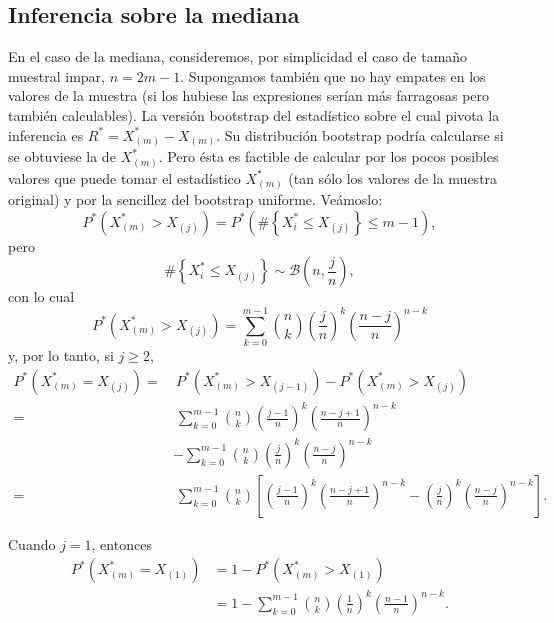 \documentclass[
]{book}
\theoremstyle{definition}
\theoremstyle{definition}
\theoremstyle{definition}
\theoremstyle{remark}
\begin{document}
\hypertarget{inferencia-sobre-la-mediana}{%
\subsection{Inferencia sobre la mediana}\label{inferencia-sobre-la-mediana}}

En el caso de la mediana, consideremos, por simplicidad el caso de
tamaño muestral impar, \(n=2m-1\). Supongamos también que no hay empates
en los valores de la muestra (si los hubiese las expresiones serían más
farragosas pero también calculables). La versión bootstrap del
estadístico sobre el cual pivota la inferencia es \(R^{\ast}=X_{\left( m \right)}^{\ast}-X_{(m)}\). Su distribución bootstrap
podría calcularse si se obtuviese la de \(X_{(m)}^{\ast}\).
Pero ésta es factible de calcular por los pocos posibles valores que
puede tomar el estadístico \(X_{(m)}^{\ast}\) (tan sólo los
valores de la muestra original) y por la sencillez del bootstrap
uniforme.
Veámoslo:
\[P^{\ast}\left( X_{(m)}^{\ast}>X_{(j)} \right)
=P^{\ast}\left( \#\left\{ X_i^{\ast}\leq X_{(j)}\right\}
\leq m-1 \right),\]
pero
\[\#\left\{ X_i^{\ast}\leq X_{(j)}\right\} \sim \mathcal{B}\left(
n,\frac{j}{n} \right),\]
con lo cual
\[P^{\ast}\left( X_{(m)}^{\ast}>X_{(j)} \right)
=\sum_{k=0}^{m-1}\binom{n}{k}\left( \frac{j}{n} \right)^{k}
\left( \frac{n-j}{n} \right)^{n-k}\]
y, por lo tanto, si \(j\geq 2\),
\[\begin{aligned}
P^{\ast}\left( X_{(m)}^{\ast}=X_{(j)} \right)
=&\ P^{\ast}\left( X_{(m)}^{\ast}>X_{\left( j-1 \right)} \right)
-P^{\ast}\left( X_{(m)}^{\ast}>X_{(j)} \right) \\
=&\ \sum_{k=0}^{m-1}\binom{n}{k}\left( \frac{j-1}{n} \right)^{k}\left( \frac{
n-j+1}{n} \right)^{n-k} \\
&-\sum_{k=0}^{m-1}\binom{n}{k}\left( \frac{j}{n} \right)^{k}\left( \frac{n-j}{
n} \right)^{n-k} \\
=&\ \sum_{k=0}^{m-1}\binom{n}{k}\left[ \left( \frac{j-1}{n} \right)^{k}\left( 
\frac{n-j+1}{n} \right)^{n-k}-\left( \frac{j}{n} \right)^{k}\left( \frac{n-j
}{n} \right)^{n-k}\right] .
\end{aligned}\]

Cuando \(j=1\), entonces
\[\begin{aligned}
P^{\ast}\left( X_{(m)}^{\ast} = X_{(1)} \right)
&= 1-P^{\ast}\left( X_{(m)}^{\ast}>X_{(1)} \right) \\
&=  1-\sum_{k=0}^{m-1}\binom{n}{k}\left( \frac{1}{n} \right)^{k}
\left( \frac{n-1}{n} \right)^{n-k}.
\end{aligned}\]
\end{document}
